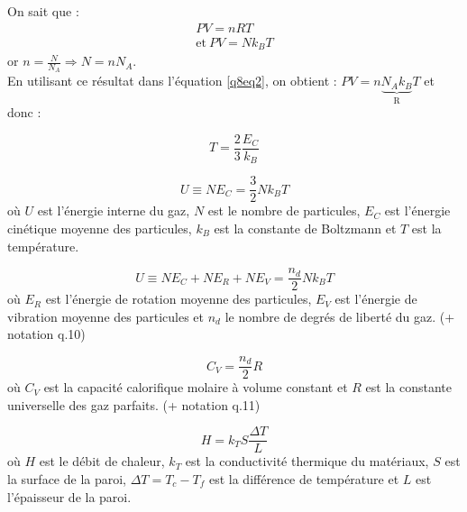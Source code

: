 \documentclass[british,french,11pt, a4paper, openany]{book}
\begin{document}
		On sait que :
		\begin{eqnarray}
			PV = nRT\\ 
			\label{q8eq2}
			\text{et}\ PV = Nk_BT
		\end{eqnarray}
		or $ n = \frac{N}{N_A} \Rightarrow N = n N_A$.\\
		En utilisant ce résultat dans l'équation \ref{q8eq2}, on obtient : $ PV = n\underbrace{N_Ak_B}_
		{\mbox{R}}T$ et donc : 
			
			
		$$ T = \frac{2}{3} \frac{E_C}{k_B}$$
			
			
		$$ U \equiv NE_C = \frac{3}{2}Nk_BT$$ où $U$ est l’énergie interne du gaz, $N$ est le nombre de particules, $E_C$ est l’énergie cinétique moyenne des particules, $k_B$ est la constante de Boltzmann et $T$ est la température.
			
			
		$$U \equiv NE_C+NE_R+NE_V=\frac{n_d}{2}Nk_BT$$ où $E_R$ est l’énergie de rotation moyenne des particules, $E_V$ est l’énergie de vibration moyenne des particules et $n_d$ le nombre de degrés de liberté du gaz. (+ notation q.10)
			
			
		$$C_V=\frac{n_d}{2}R$$ où $C_V$ est la capacité calorifique molaire à volume constant et $R$ est la constante universelle des gaz parfaits. (+ notation q.11)
			
			
		$$H=k_TS\frac{\Delta T}{L}$$ où $H$ est le débit de chaleur, $k_T$ est la conductivité thermique du matériaux, $S$ est la surface de la paroi, $\Delta T = T_c-T_f$ est la différence de température et $L$ est l’épaisseur de la paroi.
			
\end{document}
